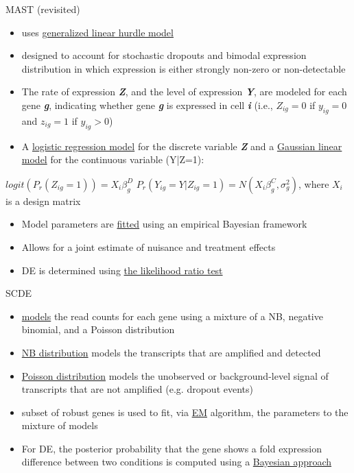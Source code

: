 \documentclass{beamer}\usepackage[]{graphicx}\usepackage[]{color}
\begin{document}
\begin{frame}
\begin{block}{MAST (revisited)}
\vspace{0.5cm}
\scriptsize
\begin{itemize}
  \item uses \underline{generalized linear hurdle model}
  \item designed to account for stochastic dropouts and bimodal expression distribution in which expression is either strongly non-zero or non-detectable
  \item The rate of expression \textbf{\textit{Z}}, and the level of expression \textbf{\textit{Y}}, are modeled for each gene \textbf{\textit{g}}, indicating whether gene \textbf{\textit{g}} is expressed in cell \textbf{\textit{i}} (i.e., $Z_{ig}=0$ if $y_{ig}=0$ and $z_{ig}=1$ if $y_{ig}>0$)
  \item A \underline{logistic regression model} for the discrete variable \textbf{\textit{Z}} and a \underline{Gaussian linear model} for the continuous variable (Y|Z=1):
   \end{itemize}
   \begin{center}
    $logit (P_r(Z_{ig}=1))=X_i\beta_g^D$ \newline
    $P_r(Y_{ig}=Y|Z_{ig}=1)=N(X_i\beta_g^C,\sigma_g^2)$, where $X_i$ is a design matrix
\end{center}
\begin{itemize}
\item Model parameters are \underline{fitted} using an empirical Bayesian framework
\item Allows for a joint estimate of nuisance and treatment effects
\item DE is determined using \underline{the likelihood ratio test}
\end{itemize}
\end{block}
\end{frame}

\begin{frame}
\begin{block}{SCDE}
\vspace{0.5cm}
\scriptsize
\begin{itemize}
  \item \underline{models} the read counts for each gene using a mixture of a NB, negative binomial, and a Poisson distribution
  \item \underline{NB distribution} models the transcripts that are amplified and detected
  \item \underline{Poisson distribution} models the unobserved or background-level signal of transcripts that are not amplified (e.g. dropout events)
  \item subset of robust genes is used to fit, via \underline{EM} algorithm, the parameters to the mixture of models
  \item For DE, the posterior probability that the gene shows a fold expression difference between two conditions is computed using a \underline{Bayesian approach}
\end{itemize}
\end{block}
\end{frame}
\end{document}
